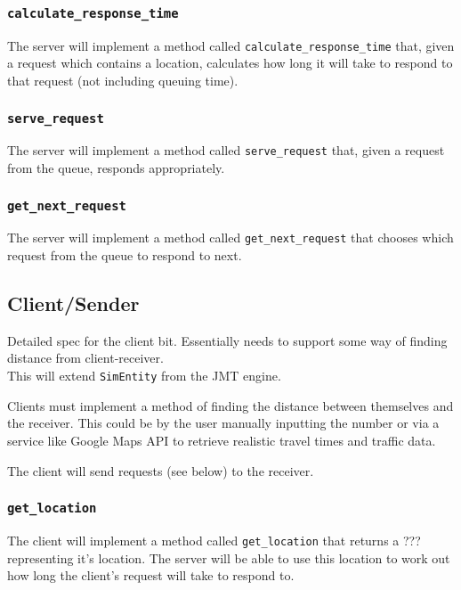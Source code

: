 \documentclass[a4paper]{article}
\begin{document}
\subsubsection{\lstinline{calculate_response_time}}

The server will implement a method called \lstinline{calculate_response_time} that, given a request which contains a location, calculates how long it will take to respond to that request (not including queuing time).

\subsubsection{\lstinline{serve_request}}

The server will implement a method called \lstinline{serve_request} that, given a request from the queue, responds appropriately.

\subsubsection{\lstinline{get_next_request}}

The server will implement a method called \lstinline{get_next_request} that chooses which request from the queue to respond to next.

\subsection{Client/Sender}%

Detailed spec for the client bit. Essentially needs to support some way
of finding distance from client-receiver.\\

This will extend \lstinline{SimEntity} from the JMT engine.

Clients must implement a method of finding the distance between themselves and the receiver. This could be by the user manually inputting the number or via a service like Google Maps API to retrieve realistic travel times and traffic data.

The client will send requests (see below) to the receiver.

\subsubsection{\lstinline{get_location}}

The client will implement a method called \lstinline{get_location} that returns a ??? representing it's location. The server will be able to use this location to work out how long the client's request will take to respond to.
\end{document}
